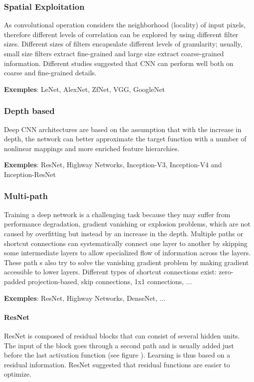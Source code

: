 \subsubsection{Spatial Exploitation}
As convolutional operation considers the neighborhood (locality) of input pixels, therefore different levels of correlation can be explored by using different filter sizes. Different sizes of filters encapsulate different levels of granularity; usually, small size filters extract fine-grained and large size extract coarse-grained information.
Different studies suggested that CNN can perform well both on coarse and fine-grained details.

\textbf{Exemples}: LeNet, AlexNet, ZfNet, VGG, GoogleNet

\subsubsection{Depth based}
Deep CNN architectures are based on the assumption that with the increase in depth, the network can better approximate the target function with a number of nonlinear mappings and more enriched feature hierarchies.

\textbf{Exemples}: ResNet, Highway Networks, Inception-V3, Inception-V4 and Inception-ResNet

\subsubsection{Multi-path}
Training a deep network is a challenging task because they may suffer from performance degradation, gradient vanishing or explosion problems, which are not caused by overfitting but instead by an increase in the depth. Multiple paths or shortcut connections can systematically connect one layer to another by skipping some intermediate layers to allow specialized flow of information across the layers. These path s also try to solve the vanishing gradient problem by making gradient accessible to lower layers. Different types of shortcut connections exist: zero-padded projection-based, skip connections, 1x1 connections, ...

\textbf{Exemples}: ResNet, Highway Networks, DenseNet, ... 

\paragraph{ResNet}
ResNet is composed of residual blocks that can consist of several hidden units. The input of the block goes through a second path and is usually added just before the last activation function (see figure \label{fig:resnet}).
Learning is thus based on a residual information. ResNet suggested that residual functions are easier to optimize.

